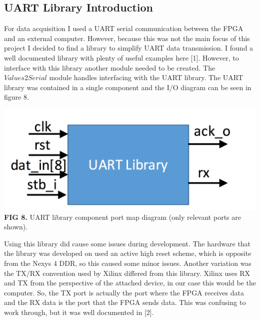 \documentclass{article}
\begin{document}
\subsection{UART Library Introduction}
For data acquisition I used a UART serial communication between the FPGA and an external computer. However, because this was not the main focus of this project I decided to find a library to simplify UART data transmission. I found a well documented library with plenty of useful examples here [1]. However, to interface with this library another module needed to be created. The $Values2Serial$ module handles interfacing with the UART library. The UART library was contained in a single component and the I/O diagram can be seen in figure 8.
\begin{center} 
\includegraphics[scale=.35]{images/uartIO}\\
\textbf{FIG 8.} UART library component port map diagram (only relevant ports are shown).\\
\end{center}
Using this library did cause some issues during development. The hardware that the library was developed on used an active high reset scheme, which is opposite from the Nexys 4 DDR, so this caused some minor issues. Another variation was the TX/RX convention used by Xilinx differed from this library. Xilinx uses RX and TX from the perspective of the attached device, in our case this would be the computer. So, the TX port is actually the port where the FPGA receives data and the RX data is the port that the FPGA sends data. This was confusing to work through, but it was well documented in [2].
\end{document}
